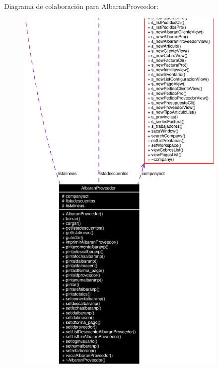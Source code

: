 Diagrama de colaboraci\'{o}n para Albaran\-Proveedor:\begin{figure}[H]
\begin{center}
\leavevmode
\includegraphics[width=289pt]{classAlbaranProveedor__coll__graph}
\end{center}
\end{figure}
